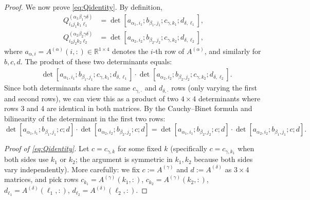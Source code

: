 \documentclass[12pt]{article}
\theoremstyle{definition}
\newcommand{\R}{\mathbb{R}}
\begin{document}
\begin{proof}
We now prove \eqref{eq:Qidentity}. By definition,
\begin{align*}
Q^{(\alpha_1\beta_1\gamma\delta)}_{i_1j_1k_1\ell_1} &= \det[a_{\alpha_1,i_1}; b_{\beta_1,j_1}; c_{\gamma,k_1}; d_{\delta,\ell_1}], \\
Q^{(\alpha_2\beta_2\gamma\delta)}_{i_2j_2k_2\ell_2} &= \det[a_{\alpha_2,i_2}; b_{\beta_2,j_2}; c_{\gamma,k_2}; d_{\delta,\ell_2}],
\end{align*}
where $a_{\alpha,i} = A^{(\alpha)}(i,:) \in \R^{1\times 4}$ denotes the $i$-th row of $A^{(\alpha)}$, and similarly for $b,c,d$. The product of these two determinants equals:
\begin{align*}
&\det[a_{\alpha_1,i_1}; b_{\beta_1,j_1}; c_{\gamma,k_1}; d_{\delta,\ell_1}] \cdot \det[a_{\alpha_2,i_2}; b_{\beta_2,j_2}; c_{\gamma,k_2}; d_{\delta,\ell_2}].
\end{align*}
Since both determinants share the same $c_{\gamma,\cdot}$ and $d_{\delta,\cdot}$ rows (only varying the first and second rows), we can view this as a product of two $4\times 4$ determinants where rows 3 and 4 are identical in both matrices. By the Cauchy--Binet formula and bilinearity of the determinant in the first two rows:
\[
\det[a_{\alpha_1,i_1}; b_{\beta_1,j_1}; c; d]\cdot\det[a_{\alpha_2,i_2}; b_{\beta_2,j_2}; c; d]
= \det[a_{\alpha_1,i_1}; b_{\beta_2,j_2}; c; d]\cdot\det[a_{\alpha_2,i_2}; b_{\beta_1,j_1}; c; d].
\]

\noindent\emph{Proof of \eqref{eq:Qidentity}.}
Let $c = c_{\gamma,k}$ for some fixed $k$ (specifically $c = c_{\gamma,k_1}$ when both sides use $k_1$ or $k_2$; the argument is symmetric in $k_1,k_2$ because both sides vary independently). More carefully: we fix $c := A^{(\gamma)}$ and $d := A^{(\delta)}$ as $3\times 4$ matrices, and pick rows $c_{k_1} = A^{(\gamma)}(k_1,:)$, $c_{k_2} = A^{(\gamma)}(k_2,:)$, $d_{\ell_1} = A^{(\delta)}(\ell_1,:)$, $d_{\ell_2} = A^{(\delta)}(\ell_2,:)$.


\end{proof}
\end{document}
